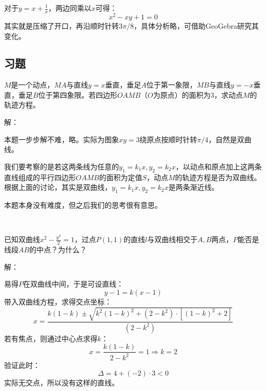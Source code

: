 \begin{figure}[h]
\centering
{}
\end{figure}

对于$y=x+\frac{1}{x}$，两边同乘以$x$可得：
\[
x^2-xy+1=0
\]
其实就是压缩了开口，再沿顺时针转$3\pi /8$，具体分析略，可借助GeoGebra研究其变化。

\subsection{习题}

\begin{example}
$M$是一个动点，$MA$与直线$y=x$垂直，垂足$A$位于第一象限，$MB$与直线$y=-x$垂直，垂足$B$位于第四象限。若四边形$OAMB$（$O$为原点）的面积为3，求动点$M$的轨迹方程。
\end{example}

解：

本题一步步解不难，略。实际为图象$xy=3$绕原点按顺时针转$\pi /4$，自然是双曲线。

我们要考察的是若这两条线为任意的$y_1=k_1x,y_2=k_2x$，以动点和原点加上这两条直线组成的平行四边形$OAMB$的面积为定值$S$，动点$M$的轨迹方程是否为双曲线。根据上面的讨论，其实是双曲线，$y_1=k_1x,y_2=k_2x$是两条渐近线。

\begin{tcolorbox}
本题本身没有难度，但之后我们的思考很有意思。
\end{tcolorbox}

~

\begin{example}
已知双曲线$x^2-\frac{y^2}{2}=1$，过点$P\left( 1,1 \right) $的直线$l$与双曲线相交于$A,B$两点，$P$能否是线段$AB$的中点？为什么？
\end{example}

解：

易得$P$在双曲线中间，于是可设直线：
\[
y-1=k\left( x-1 \right)
\]
带入双曲线方程，求得交点坐标：
\[
x=\frac{k\left( 1-k \right) \pm \sqrt{k^2\left( 1-k \right) ^2+\left( 2-k^2 \right) \cdot \left[ \left( 1-k \right) ^2+2 \right]}}{\left( 2-k^2 \right)}
\]
若有焦点，则通过中心点求得$k$：
\[
x=\frac{k\left( 1-k \right)}{2-k^2}=1\Rightarrow k=2
\]
验证此时：
\[
\varDelta =4+\left( -2 \right) \cdot 3<0
\]
实际无交点，所以没有这样的直线。


